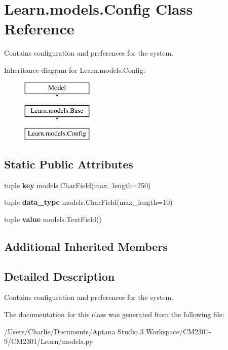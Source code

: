 \hypertarget{class_learn_1_1models_1_1_config}{\section{Learn.\-models.\-Config Class Reference}
\label{class_learn_1_1models_1_1_config}
}


Contains configuration and preferences for the system.  


Inheritance diagram for Learn.\-models.\-Config\-:\begin{figure}[H]
\begin{center}
\leavevmode
\includegraphics[height=3.000000cm]{class_learn_1_1models_1_1_config}
\end{center}
\end{figure}
\subsection*{Static Public Attributes}
\begin{DoxyCompactItemize}
\item 
\hypertarget{class_learn_1_1models_1_1_config_a14464f0683bf2c56133324c7849430d9}{tuple {\bfseries key} models.\-Char\-Field(max\-\_\-length=250)}\label{class_learn_1_1models_1_1_config_a14464f0683bf2c56133324c7849430d9}

\item 
\hypertarget{class_learn_1_1models_1_1_config_a37e7b20ea410084253f7153c9927aee0}{tuple {\bfseries data\-\_\-type} models.\-Char\-Field(max\-\_\-length=10)}\label{class_learn_1_1models_1_1_config_a37e7b20ea410084253f7153c9927aee0}

\item 
\hypertarget{class_learn_1_1models_1_1_config_a6a5401b43266f147e0f0b112749531c9}{tuple {\bfseries value} models.\-Text\-Field()}\label{class_learn_1_1models_1_1_config_a6a5401b43266f147e0f0b112749531c9}

\end{DoxyCompactItemize}
\subsection*{Additional Inherited Members}


\subsection{Detailed Description}
Contains configuration and preferences for the system. 

The documentation for this class was generated from the following file\-:\begin{DoxyCompactItemize}
\item 
/\-Users/\-Charlie/\-Documents/\-Aptana Studio 3 Workspace/\-C\-M2301-\/9/\-C\-M2301/\-Learn/models.\-py\end{DoxyCompactItemize}
